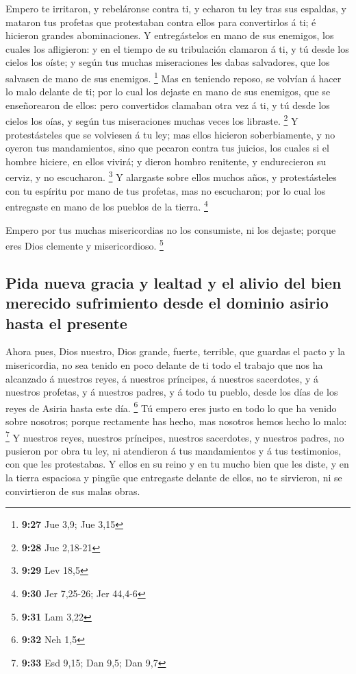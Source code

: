  Empero te irritaron, y rebeláronse contra ti, y echaron
tu ley tras sus espaldas, y mataron tus profetas que protestaban contra
ellos para convertirlos á ti; é hicieron grandes abominaciones.
 Y entregástelos en mano de sus enemigos, los cuales los
afligieron: y en el tiempo de su tribulación clamaron á ti, y tú desde
los cielos los oíste; y según tus muchas miseraciones les dabas
salvadores, que los salvasen de mano de sus enemigos. \footnote{\textbf{9:27}
  Jue 3,9; Jue 3,15}  Mas en teniendo reposo, se volvían
á hacer lo malo delante de ti; por lo cual los dejaste en mano de sus
enemigos, que se enseñorearon de ellos: pero convertidos clamaban otra
vez á ti, y tú desde los cielos los oías, y según tus miseraciones
muchas veces los libraste. \footnote{\textbf{9:28} Jue 2,18-21}
 Y protestásteles que se volviesen á tu ley; mas ellos
hicieron soberbiamente, y no oyeron tus mandamientos, sino que pecaron
contra tus juicios, los cuales si el hombre hiciere, en ellos vivirá; y
dieron hombro renitente, y endurecieron su cerviz, y no escucharon.
\footnote{\textbf{9:29} Lev 18,5}  Y alargaste sobre
ellos muchos años, y protestásteles con tu espíritu por mano de tus
profetas, mas no escucharon; por lo cual los entregaste en mano de los
pueblos de la tierra. \footnote{\textbf{9:30} Jer 7,25-26; Jer 44,4-6}

 Empero por tus muchas misericordias no los consumiste,
ni los dejaste; porque eres Dios clemente y misericordioso. \footnote{\textbf{9:31}
  Lam 3,22}

\hypertarget{pida-nueva-gracia-y-lealtad-y-el-alivio-del-bien-merecido-sufrimiento-desde-el-dominio-asirio-hasta-el-presente}{%
\subsection{Pida nueva gracia y lealtad y el alivio del bien merecido
sufrimiento desde el dominio asirio hasta el
presente}\label{pida-nueva-gracia-y-lealtad-y-el-alivio-del-bien-merecido-sufrimiento-desde-el-dominio-asirio-hasta-el-presente}}

 Ahora pues, Dios nuestro, Dios grande, fuerte, terrible,
que guardas el pacto y la misericordia, no sea tenido en poco delante de
ti todo el trabajo que nos ha alcanzado á nuestros reyes, á nuestros
príncipes, á nuestros sacerdotes, y á nuestros profetas, y á nuestros
padres, y á todo tu pueblo, desde los días de los reyes de Asiria hasta
este día. \footnote{\textbf{9:32} Neh 1,5}  Tú empero
eres justo en todo lo que ha venido sobre nosotros; porque rectamente
has hecho, mas nosotros hemos hecho lo malo: \footnote{\textbf{9:33} Esd
  9,15; Dan 9,5; Dan 9,7}  Y nuestros reyes, nuestros
príncipes, nuestros sacerdotes, y nuestros padres, no pusieron por obra
tu ley, ni atendieron á tus mandamientos y á tus testimonios, con que
les protestabas.  Y ellos en su reino y en tu mucho bien
que les diste, y en la tierra espaciosa y pingüe que entregaste delante
de ellos, no te sirvieron, ni se convirtieron de sus malas obras.

